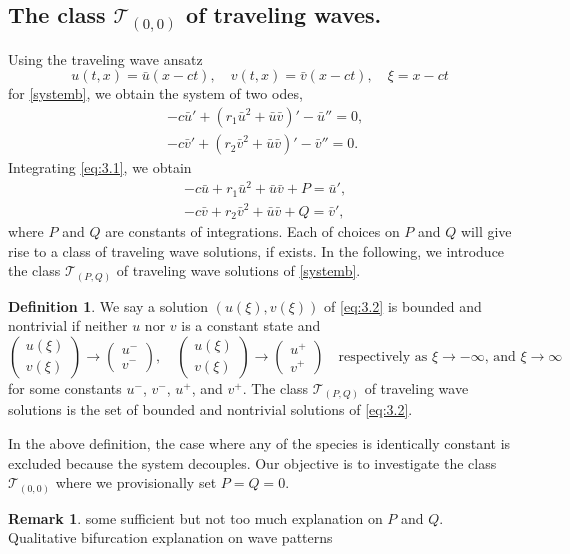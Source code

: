 \documentclass{amsart}
\def\red{\color{red}}
\theoremstyle{definition}
\newtheorem{defn}[thm1]{Definition}
\newtheorem{rmk}[thm1]{Remark}
\numberwithin{equation}{section}
\begin{document}
\subsection{The class $\mathcal{T}_{(0,0)}$ of traveling waves.}

Using the traveling wave ansatz 
$$u(t,x) = \bar{u}(x-ct), \quad v(t,x) = \bar{v}(x-ct), \quad \xi = x-ct$$ for \eqref{systemb}, we obtain the system of two odes,
\begin{equation}\label{eq:3.1}
\begin{aligned}
&-c\bar{u}' + ( r_{1}\bar{u}^{2} + \bar{u}  \bar{v} )'- \bar{u}'' = 0, \\
&-c\bar{v}' + ( r_{2}\bar{v}^{2} + \bar{u}  \bar{v} )' -\bar{v}'' =  0.
\end{aligned}
\end{equation}
Integrating \eqref{eq:3.1}, we obtain
\begin{equation}\label{eq:3.2}
\begin{aligned}
&-c\bar{u} + r_{1}\bar{u}^{2} + \bar{u}  \bar{v} + P = \bar{u}', \\
&-c\bar{v} + r_{2}\bar{v}^{2} + \bar{u}  \bar{v} + Q = \bar{v}',
\end{aligned}
\end{equation}
where $P$ and $Q$ are constants of integrations. Each of choices on $P$ and $Q$ will give rise to a class of traveling wave solutions, if exists. In the following, we introduce the class $\mathcal{T}_{(P,Q)}$ of traveling wave solutions of \eqref{systemb}.

\begin{defn} \label{nontrivial} We say a solution $({u}(\xi),{v}(\xi))$ of \eqref{eq:3.2} is  bounded and  nontrivial if neither $u$ nor $v$ is a constant state and
$$ \begin{pmatrix} u(\xi) \\ v(\xi) \end{pmatrix} \rightarrow \begin{pmatrix} u^- \\ v^- \end{pmatrix}, \quad \begin{pmatrix} u(\xi) \\ v(\xi) \end{pmatrix} \rightarrow \begin{pmatrix} u^+ \\ v^+ \end{pmatrix} \quad \text{respectively as $\xi \rightarrow -\infty$, and $\xi \rightarrow \infty$}$$
 for some constants $u^-$, $v^-$, $u^+$, and $v^+$. The class $\mathcal{T}_{(P,Q)}$ of traveling wave solutions is the set of bounded and nontrivial solutions of \eqref{eq:3.2}. 
\end{defn}
In the above definition, the case where any of the species is identically constant is excluded because the system decouples. Our objective is to investigate the class $\mathcal{T}_{(0,0)}$ where we provisionally set $P=Q=0$. %
\begin{rmk}
 {\red some sufficient but not too much explanation on $P$ and $Q$. Qualitative bifurcation explanation on wave patterns}
\end{rmk}
\end{document}
